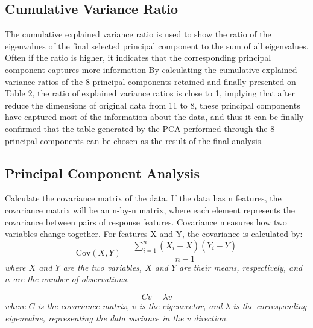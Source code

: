 \documentclass[twocolumn]{IEEEtran}
\begin{document}
\subsection{Cumulative Variance Ratio}
The cumulative explained variance ratio is used to show the ratio of the eigenvalues of the final selected principal component to the sum of all eigenvalues. Often if the ratio is higher, it indicates that the corresponding principal component captures more information
By calculating the cumulative explained variance ratios of the 8 principal components retained and finally presented on Table 2, the ratio of explained variance ratios is close to 1, implying that after reduce the dimensions of original data from 11 to 8, these principal components have captured most of the information about the data, and thus it can be finally confirmed that the table generated by the PCA performed through the 8 principal components can be chosen as the result of the final analysis.



\subsection{Principal Component Analysis}
Calculate the covariance matrix of the data. If the data has n features, the covariance matrix will be an n-by-n matrix, where each element represents the covariance between pairs of response features. Covariance measures how two variables change together. For features X and Y, the covariance is calculated by:
\begin{equation}
    \text{Cov}(X, Y) = \frac{\sum_{i=1}^{n} (X_i - \bar{X})(Y_i - \bar{Y})}{n-1}
\end{equation}
\textit{where \(X\) and \(Y\) are the two variables, \(\bar{X}\) and \(\bar{Y}\) are their means, respectively, and \(n\) are the number of observations.}
    
\begin{equation}
    Cv = \lambda v
\end{equation}
\textit{where \(C\) is the covariance matrix, \(v\) is the eigenvector, and \(\lambda\) is the corresponding eigenvalue, representing the data variance in the \(v\) direction.}
\end{document}
